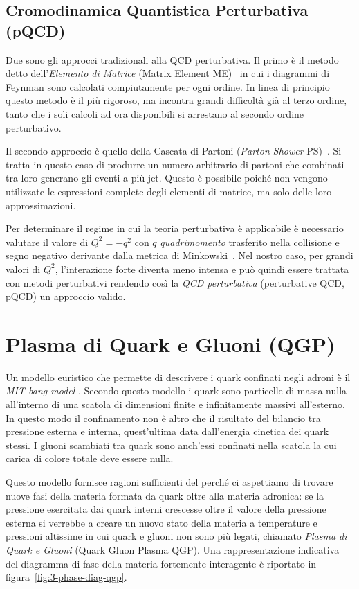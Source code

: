     \subsection{Cromodinamica Quantistica Perturbativa (pQCD)}
        Due sono gli approcci tradizionali alla QCD perturbativa. Il primo è il metodo detto dell'\textit{Elemento di Matrice} (Matrix Element ME)~\cite{Vitale_1995} in cui i diagrammi di Feynman sono calcolati compiutamente per ogni ordine. In linea di principio questo metodo è il più rigoroso, ma incontra grandi difficoltà già al terzo ordine, tanto che i soli calcoli ad ora disponibili si arrestano al secondo ordine perturbativo.

        Il secondo approccio è quello della Cascata di Partoni (\textit{Parton Shower} PS)~\cite{Bambah_1989}. Si tratta in questo caso di produrre un numero arbitrario di partoni che combinati tra loro generano gli eventi a più jet. Questo è possibile poiché non vengono utilizzate le espressioni complete degli elementi di matrice, ma solo delle loro approssimazioni.

        Per determinare il regime in cui la teoria perturbativa è applicabile è necessario valutare il valore di $Q^2 = - q^2$ con $q$ \textit{quadrimomento} trasferito nella collisione e segno negativo derivante dalla metrica di Minkowski~\cite{Altarelli_2004}. Nel nostro caso, per grandi valori di $Q^2$, l'interazione forte diventa meno intensa e può quindi essere trattata con metodi perturbativi rendendo così la \textit{QCD perturbativa} (perturbative QCD, pQCD) un approccio valido.

\newpage

\section{Plasma di Quark e Gluoni (QGP)}
\label{sec:QGP}
    Un modello euristico che permette di descrivere i quark confinati negli adroni è il \textit{MIT bang model} \cite{Wong_1994}. Secondo questo modello i quark sono particelle di massa nulla all'interno di una scatola di dimensioni finite e infinitamente massivi all'esterno. In questo modo il confinamento non è altro che il risultato del bilancio tra pressione esterna e interna, quest'ultima data dall'energia cinetica dei quark stessi. I gluoni scambiati tra quark sono anch'essi confinati nella scatola la cui carica di colore totale deve essere nulla.
    
    Questo modello fornisce ragioni sufficienti del perché ci aspettiamo di trovare nuove fasi della materia formata da quark oltre alla materia adronica: se la pressione esercitata dai quark interni crescesse oltre il valore della pressione esterna si verrebbe a creare un nuovo stato della materia a temperature e pressioni altissime in cui quark e gluoni non sono più legati, chiamato \textit{Plasma di Quark e Gluoni} (Quark Gluon Plasma QGP). Una rappresentazione indicativa del diagramma di fase della materia fortemente interagente è riportato in figura~\ref{fig:3-phase-diag-qgp}.
    

